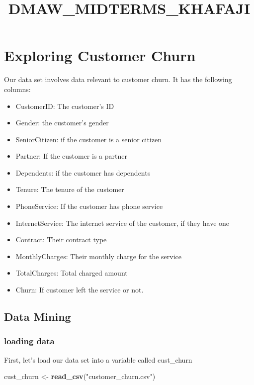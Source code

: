 \documentclass[
]{article}
\title{DMAW\_MIDTERMS\_KHAFAJI}
\author{}
\date{\vspace{-2.5em}}
\newenvironment{Shaded}{\begin{snugshade}}{\end{snugshade}}
\newcommand{\FunctionTok}[1]{\textcolor[rgb]{0.13,0.29,0.53}{\textbf{#1}}}
\newcommand{\NormalTok}[1]{#1}
\newcommand{\OtherTok}[1]{\textcolor[rgb]{0.56,0.35,0.01}{#1}}
\newcommand{\StringTok}[1]{\textcolor[rgb]{0.31,0.60,0.02}{#1}}
\providecommand{\tightlist}{%
  \setlength{\itemsep}{0pt}\setlength{\parskip}{0pt}}
\begin{document}
\maketitle

\section{Exploring Customer Churn}\label{exploring-customer-churn}

Our data set involves data relevant to customer churn. It has the
following columns:

\begin{itemize}
\tightlist
\item
  CustomerID: The customer's ID
\item
  Gender: the customer's gender
\item
  SeniorCitizen: if the customer is a senior citizen
\item
  Partner: If the customer is a partner
\item
  Dependents: if the customer has dependents
\item
  Tenure: The tenure of the customer
\item
  PhoneService: If the customer has phone service
\item
  InternetService: The internet service of the customer, if they have
  one
\item
  Contract: Their contract type
\item
  MonthlyCharges: Their monthly charge for the service
\item
  TotalCharges: Total charged amount
\item
  Churn: If customer left the service or not.
\end{itemize}

\subsection{Data Mining}\label{data-mining}

\subsubsection{loading data}\label{loading-data}

First, let's load our data set into a variable called cust\_churn

\begin{Shaded}
\begin{Highlighting}[]
\NormalTok{cust\_churn }\OtherTok{\textless{}{-}} \FunctionTok{read\_csv}\NormalTok{(}\StringTok{"customer\_churn.csv"}\NormalTok{)}
\end{Highlighting}
\end{Shaded}
\end{document}
